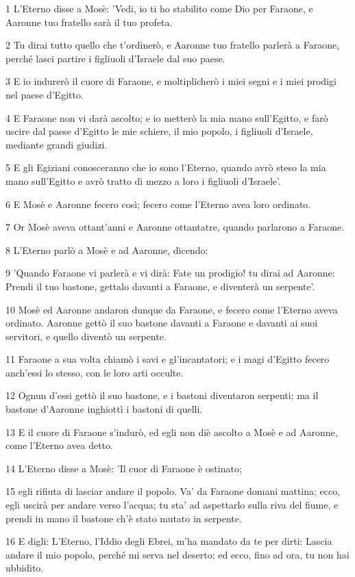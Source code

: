 \par 1 L'Eterno disse a Mosè: 'Vedi, io ti ho stabilito come Dio per Faraone, e Aaronne tuo fratello sarà il tuo profeta.
\par 2 Tu dirai tutto quello che t'ordinerò, e Aaronne tuo fratello parlerà a Faraone, perché lasci partire i figliuoli d'Israele dal suo paese.
\par 3 E io indurerò il cuore di Faraone, e moltiplicherò i miei segni e i miei prodigi nel paese d'Egitto.
\par 4 E Faraone non vi darà ascolto; e io metterò la mia mano sull'Egitto, e farò uscire dal paese d'Egitto le mie schiere, il mio popolo, i figliuoli d'Israele, mediante grandi giudizi.
\par 5 E gli Egiziani conosceranno che io sono l'Eterno, quando avrò steso la mia mano sull'Egitto e avrò tratto di mezzo a loro i figliuoli d'Israele'.
\par 6 E Mosè e Aaronne fecero così; fecero come l'Eterno avea loro ordinato.
\par 7 Or Mosè aveva ottant'anni e Aaronne ottantatre, quando parlarono a Faraone.
\par 8 L'Eterno parlò a Mosè e ad Aaronne, dicendo:
\par 9 'Quando Faraone vi parlerà e vi dirà: Fate un prodigio! tu dirai ad Aaronne: Prendi il tuo bastone, gettalo davanti a Faraone, e diventerà un serpente'.
\par 10 Mosè ed Aaronne andaron dunque da Faraone, e fecero come l'Eterno aveva ordinato. Aaronne gettò il suo bastone davanti a Faraone e davanti ai suoi servitori, e quello diventò un serpente.
\par 11 Faraone a sua volta chiamò i savi e gl'incantatori; e i magi d'Egitto fecero anch'essi lo stesso, con le loro arti occulte.
\par 12 Ognun d'essi gettò il suo bastone, e i bastoni diventaron serpenti; ma il bastone d'Aaronne inghiottì i bastoni di quelli.
\par 13 E il cuore di Faraone s'indurò, ed egli non diè ascolto a Mosè e ad Aaronne, come l'Eterno avea detto.
\par 14 L'Eterno disse a Mosè: 'Il cuor di Faraone è ostinato;
\par 15 egli rifiuta di lasciar andare il popolo. Va' da Faraone domani mattina; ecco, egli uscirà per andare verso l'acqua; tu sta' ad aspettarlo sulla riva del fiume, e prendi in mano il bastone ch'è stato mutato in serpente.
\par 16 E digli: L'Eterno, l'Iddio degli Ebrei, m'ha mandato da te per dirti: Lascia andare il mio popolo, perché mi serva nel deserto; ed ecco, fino ad ora, tu non hai ubbidito.
